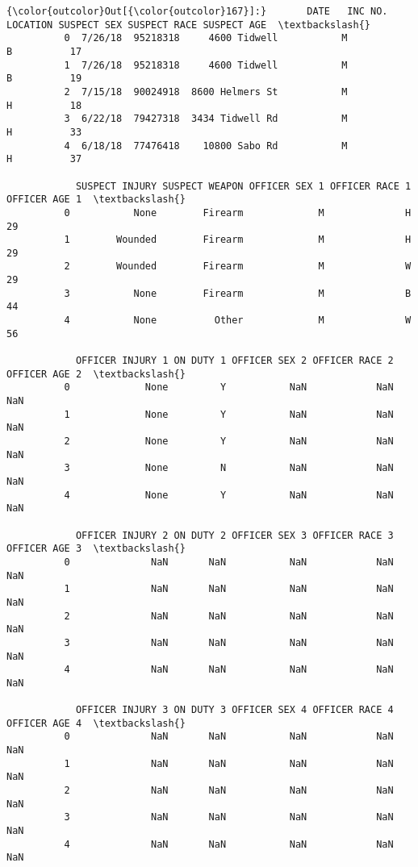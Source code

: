 \documentclass[11pt]{article}
\begin{document}
\begin{Verbatim}[commandchars=\\\{\}]
{\color{outcolor}Out[{\color{outcolor}167}]:}       DATE   INC NO.         LOCATION SUSPECT SEX SUSPECT RACE SUSPECT AGE  \textbackslash{}
          0  7/26/18  95218318     4600 Tidwell           M            B          17   
          1  7/26/18  95218318     4600 Tidwell           M            B          19   
          2  7/15/18  90024918  8600 Helmers St           M            H          18   
          3  6/22/18  79427318  3434 Tidwell Rd           M            H          33   
          4  6/18/18  77476418    10800 Sabo Rd           M            H          37   
          
            SUSPECT INJURY SUSPECT WEAPON OFFICER SEX 1 OFFICER RACE 1  OFFICER AGE 1  \textbackslash{}
          0           None        Firearm             M              H             29   
          1        Wounded        Firearm             M              H             29   
          2        Wounded        Firearm             M              W             29   
          3           None        Firearm             M              B             44   
          4           None          Other             M              W             56   
          
            OFFICER INJURY 1 ON DUTY 1 OFFICER SEX 2 OFFICER RACE 2  OFFICER AGE 2  \textbackslash{}
          0             None         Y           NaN            NaN            NaN   
          1             None         Y           NaN            NaN            NaN   
          2             None         Y           NaN            NaN            NaN   
          3             None         N           NaN            NaN            NaN   
          4             None         Y           NaN            NaN            NaN   
          
            OFFICER INJURY 2 ON DUTY 2 OFFICER SEX 3 OFFICER RACE 3  OFFICER AGE 3  \textbackslash{}
          0              NaN       NaN           NaN            NaN            NaN   
          1              NaN       NaN           NaN            NaN            NaN   
          2              NaN       NaN           NaN            NaN            NaN   
          3              NaN       NaN           NaN            NaN            NaN   
          4              NaN       NaN           NaN            NaN            NaN   
          
            OFFICER INJURY 3 ON DUTY 3 OFFICER SEX 4 OFFICER RACE 4  OFFICER AGE 4  \textbackslash{}
          0              NaN       NaN           NaN            NaN            NaN   
          1              NaN       NaN           NaN            NaN            NaN   
          2              NaN       NaN           NaN            NaN            NaN   
          3              NaN       NaN           NaN            NaN            NaN   
          4              NaN       NaN           NaN            NaN            NaN   
          

\end{Verbatim}
\end{document}
